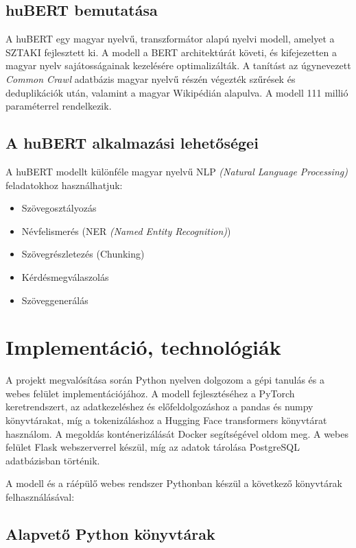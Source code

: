 \documentclass[12pt]{article}
\begin{document}
\subsection{huBERT bemutatása}

A huBERT egy magyar nyelvű, transzformátor alapú nyelvi modell, amelyet a SZTAKI fejlesztett ki. A modell a BERT architektúrát követi, és kifejezetten a magyar nyelv sajátosságainak kezelésére optimalizálták. A tanítást az úgynevezett \textit{Common Crawl} adatbázis magyar nyelvű részén végezték szűrések és deduplikációk után, valamint a magyar Wikipédián alapulva. A modell 111 millió paraméterrel rendelkezik.

\subsection{A huBERT alkalmazási lehetőségei}

A huBERT modellt különféle magyar nyelvű NLP \textit{(Natural Language Processing)} feladatokhoz használhatjuk:

\begin{itemize}
    \item Szövegosztályozás
    \item Névfelismerés (NER \textit{(Named Entity Recognition)})
    \item Szövegrészletezés (Chunking)
    \item Kérdésmegválaszolás
    \item Szöveggenerálás
\end{itemize}

\section{Implementáció, technológiák}

A projekt megvalósítása során Python nyelven dolgozom a gépi tanulás és a webes felület implementációjához. A modell fejlesztéséhez a PyTorch keretrendszert, az adatkezeléshez és előfeldolgozáshoz a pandas és numpy könyvtárakat, míg a tokenizáláshoz a Hugging Face transformers könyvtárat használom. A megoldás konténerizálását Docker segítségével oldom meg. A webes felület Flask webszerverrel készül, míg az adatok tárolása PostgreSQL adatbázisban történik.

A modell és a ráépülő webes rendszer Pythonban készül a következő könyvtárak felhasználásával:

\subsection{Alapvető Python könyvtárak}
\end{document}
